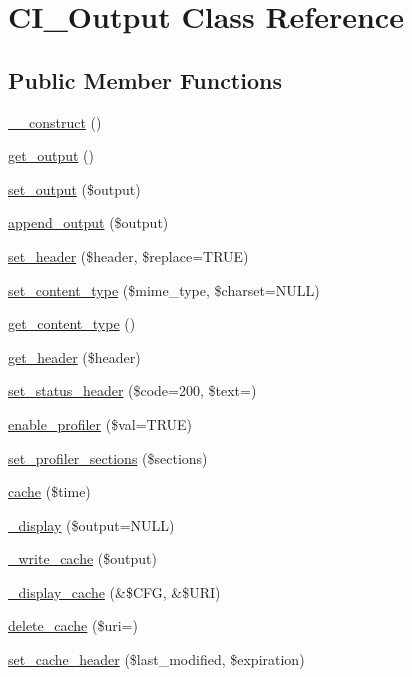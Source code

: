 \hypertarget{class_c_i___output}{}\section{C\+I\+\_\+\+Output Class Reference}
\label{class_c_i___output}
\subsection*{Public Member Functions}
\begin{DoxyCompactItemize}
\item 
\mbox{\hyperlink{class_c_i___output_a095c5d389db211932136b53f25f39685}{\+\_\+\+\_\+construct}} ()
\item 
\mbox{\hyperlink{class_c_i___output_aa6c3f8688f804de4f1af8a462fffb922}{get\+\_\+output}} ()
\item 
\mbox{\hyperlink{class_c_i___output_afcff30d791a8006216f5c2fe93a95983}{set\+\_\+output}} (\$output)
\item 
\mbox{\hyperlink{class_c_i___output_a7c79b8239d6ecbba0c8fdd00bb619651}{append\+\_\+output}} (\$output)
\item 
\mbox{\hyperlink{class_c_i___output_a270389a1636faa81eda5ef3fa900ea25}{set\+\_\+header}} (\$header, \$replace=T\+R\+UE)
\item 
\mbox{\hyperlink{class_c_i___output_a7e04aad8dafeec2b8626285e81231f0c}{set\+\_\+content\+\_\+type}} (\$mime\+\_\+type, \$charset=N\+U\+LL)
\item 
\mbox{\hyperlink{class_c_i___output_a4d8c59d65c47c9146dbc1c7d0c4eccf2}{get\+\_\+content\+\_\+type}} ()
\item 
\mbox{\hyperlink{class_c_i___output_afc84ca7f4f93817160ea738f2f899a74}{get\+\_\+header}} (\$header)
\item 
\mbox{\hyperlink{class_c_i___output_a6fa308cb1fadec4938edade0a51eb773}{set\+\_\+status\+\_\+header}} (\$code=200, \$text=\textquotesingle{}\textquotesingle{})
\item 
\mbox{\hyperlink{class_c_i___output_a7bd693db25952e1b074630f52ee67500}{enable\+\_\+profiler}} (\$val=T\+R\+UE)
\item 
\mbox{\hyperlink{class_c_i___output_ac5e50de443748cf3d356d29eba2caaaf}{set\+\_\+profiler\+\_\+sections}} (\$sections)
\item 
\mbox{\hyperlink{class_c_i___output_a6eae3cd828cf30926d44f1ab6011f939}{cache}} (\$time)
\item 
\mbox{\hyperlink{class_c_i___output_a171d6c5d4dfdc425cf9b9fe240ccbafe}{\+\_\+display}} (\$output=N\+U\+LL)
\item 
\mbox{\hyperlink{class_c_i___output_a772aa9eb3f60f66fa194443ca0bdd8a4}{\+\_\+write\+\_\+cache}} (\$output)
\item 
\mbox{\hyperlink{class_c_i___output_acce78bdac02df9ab196a9c5939f6c4ab}{\+\_\+display\+\_\+cache}} (\&\$C\+FG, \&\$U\+RI)
\item 
\mbox{\hyperlink{class_c_i___output_a475c83a7e4d2f7162032c01279c161b4}{delete\+\_\+cache}} (\$uri=\textquotesingle{}\textquotesingle{})
\item 
\mbox{\hyperlink{class_c_i___output_acd24befdfc26233abfbdc62071dcd58b}{set\+\_\+cache\+\_\+header}} (\$last\+\_\+modified, \$expiration)
\end{DoxyCompactItemize}

